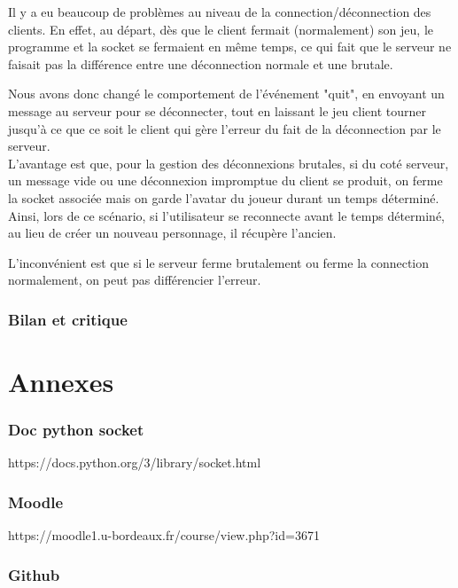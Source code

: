 \documentclass[a4paper]{article}
\begin{document}
		Il y a eu beaucoup de problèmes au niveau de la connection/déconnection des clients. En effet, au départ, dès que le client fermait (normalement) son jeu, le programme et la socket se fermaient en même temps, ce qui fait que le serveur ne faisait pas la différence entre une déconnection normale et une brutale.

		Nous avons donc changé le comportement de l'événement "quit", en envoyant un message au serveur pour se déconnecter, tout en laissant le jeu client tourner jusqu'à ce que ce soit le client qui gère l'erreur du fait de la déconnection par le serveur.
		\\
		L'avantage est que, pour la gestion des déconnexions brutales, si du coté serveur, un message vide ou une déconnexion impromptue du client se produit, on ferme la socket associée mais on garde l'avatar du joueur durant un temps déterminé. Ainsi, lors de ce scénario, si l'utilisateur se reconnecte avant le temps déterminé, au lieu de créer un nouveau personnage, il récupère l'ancien.

		L'inconvénient est que si le serveur ferme brutalement ou ferme la connection normalement, on peut pas différencier l'erreur.


	\section{Bilan et critique}

\newpage
\appendix
\part{Annexes}

\section{Doc python socket} \label{docpysoc}

https://docs.python.org/3/library/socket.html

\section{Moodle} \label{moodle}

https://moodle1.u-bordeaux.fr/course/view.php?id=3671

\section{Github} \label{github}
\end{document}
